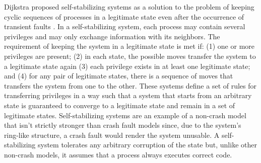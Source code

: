 \documentclass[runningheads,a4paper]{llncs}
\begin{document}
Dijkstra proposed self-stabilizing systems as a solution to the problem of keeping cyclic sequences of processes in a legitimate state even after the occurrence of transient faults \cite{Dijkstra1974}. In a self-stabilizing system, each process may contain several privileges and may only exchange information with its neighbors. The requirement of keeping the system in a legitimate state is met if: (1) one or more privileges are present; (2) in each state, the possible moves transfer the system to a legitimate state again (3) each privilege exists in at least one legitimate state; and (4) for any pair of legitimate states, there is a sequence of moves that transfers the system from one to the other. These systems define a set of rules for transferring privileges in a way such that a system that starts from an arbitrary state is guaranteed to converge to a legitimate state and remain in a set of legitimate states. Self-stabilizing systems are an example of a non-crash model that isn't strictly stronger than crash fault models since, due to the system's ring-like structure, a crash fault would render the system unusable. A self-stabilizing system tolerates any arbitrary corruption of the state but, unlike other non-crash models, it assumes that a process always executes correct code.\par
\end{document}
